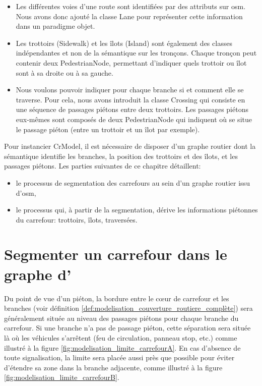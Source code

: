 \begin{itemize}
    \item Les différentes voies d'une route sont identifiées par des attributs sur \gls{osm}. Nous avons donc ajouté la classe Lane pour représenter cette information dans un paradigme objet.
    \item Les trottoirs (Sidewalk) et les îlots (Island) sont également des classes indépendantes et non de la sémantique sur les tronçons. Chaque tronçon peut contenir deux PedestrianNode, permettant d'indiquer quels trottoir ou îlot sont à sa droite ou à sa gauche.
    \item Nous voulons pouvoir indiquer pour chaque branche si et comment elle se traverse. Pour cela, nous avons introduit la classe Crossing qui consiste en une séquence de passages piétons entre deux trottoirs. Les passages piétons eux-mêmes sont composés de deux PedestrianNode qui indiquent où se situe le passage piéton (entre un trottoir et un îlot par exemple).
\end{itemize}

\newpar{}

Pour instancier CrModel, il est nécessaire de disposer d'un graphe routier dont la sémantique identifie les branches, la position des trottoirs et des îlots, et les passages piétons. Les parties suivantes de ce chapitre détaillent:
\begin{itemize}
    \item le processus de segmentation des carrefours au sein d'un graphe routier issu d'\gls{osm},
    \item le processus qui, à partir de la segmentation, dérive les informations piétonnes du carrefour: trottoirs, îlots, traversées.
\end{itemize}

\section{Segmenter un carrefour dans le graphe d'}

\label{sec:modelisation_crseg}

Du point de vue d'un piéton, la bordure entre le cœur de carrefour et les branches (voir définition \ref{def:modelisation_couverture_routiere_complète}) sera généralement située au niveau des passages piétons pour chaque branche du carrefour. Si une branche n'a pas de passage piéton, cette séparation sera située là où les véhicules s'arrêtent (feu de circulation, panneau stop, etc.) comme illustré à la figure \ref{fig:modelisation_limite_carrefourA}. En cas d'absence de toute signalisation, la limite sera placée aussi près que possible pour éviter d'étendre sa zone dans la branche adjacente, comme illustré à la figure \ref{fig:modelisation_limite_carrefourB}.

